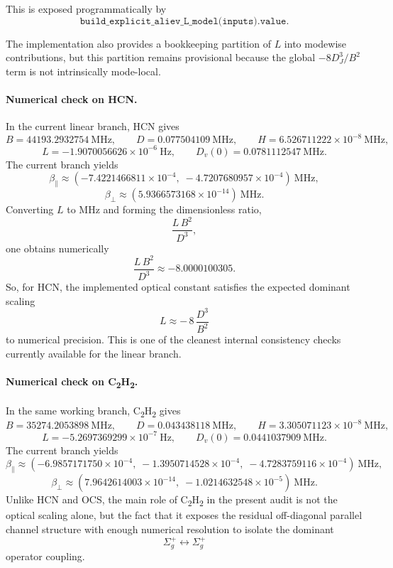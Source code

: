 \documentclass[11pt]{article}
\begin{document}
This is exposed programmatically by
\[
\texttt{build\_explicit\_aliev\_L\_model(inputs).value}.
\]

The implementation also provides a bookkeeping partition of $L$ into modewise
contributions, but this partition remains provisional because the global
$-8D_J^3/B^2$ term is not intrinsically mode-local.

\paragraph{Numerical check on HCN.}
In the current linear branch, HCN gives
\[
B = 44193.2932754\ \mathrm{MHz},
\qquad
D = 0.077504109\ \mathrm{MHz},
\qquad
H = 6.526711222\times 10^{-8}\ \mathrm{MHz},
\]
\[
L = -1.9070056626\times 10^{-6}\ \mathrm{Hz},
\qquad
D_v(0)=0.0781112547\ \mathrm{MHz}.
\]
The current branch yields
\[
\beta_{\parallel}\approx
(-7.4221466811\times 10^{-4},\;
-4.7207680957\times 10^{-4})\ \mathrm{MHz},
\]
\[
\beta_{\perp}\approx
(5.9366573168\times 10^{-14})\ \mathrm{MHz}.
\]
Converting $L$ to MHz and forming the dimensionless ratio,
\[
\frac{L\,B^2}{D^3},
\]
one obtains numerically
\[
\frac{L\,B^2}{D^3}\approx -8.0000100305.
\]
So, for HCN, the implemented optical constant satisfies the expected dominant
scaling
\[
L \approx -\,8\,\frac{D^3}{B^2}
\]
to numerical precision. This is one of the cleanest internal consistency checks
currently available for the linear branch.

\paragraph{Numerical check on \texorpdfstring{C\textsubscript{2}H\textsubscript{2}}{C2H2}.}
In the same working branch,
\texorpdfstring{C\textsubscript{2}H\textsubscript{2}}{C2H2} gives
\[
B = 35274.2053898\ \mathrm{MHz},
\qquad
D = 0.043438118\ \mathrm{MHz},
\qquad
H = 3.305071123\times 10^{-8}\ \mathrm{MHz},
\]
\[
L = -5.2697369299\times 10^{-7}\ \mathrm{Hz},
\qquad
D_v(0)=0.0441037909\ \mathrm{MHz}.
\]
The current branch yields
\[
\beta_{\parallel}\approx
(-6.9857171750\times 10^{-4},\;
-1.3950714528\times 10^{-4},\;
-4.7283759116\times 10^{-4})\ \mathrm{MHz},
\]
\[
\beta_{\perp}\approx
(7.9642614003\times 10^{-14},\;
-1.0214632548\times 10^{-5})\ \mathrm{MHz}.
\]
Unlike HCN and OCS, the main role of
\texorpdfstring{C\textsubscript{2}H\textsubscript{2}}{C2H2} in the present
audit is not the optical scaling alone, but the fact that it exposes the
residual off-diagonal parallel channel structure with enough numerical
resolution to isolate the dominant
\[
\Sigma_g^+ \longleftrightarrow \Sigma_g^+
\]
operator coupling.
\end{document}
